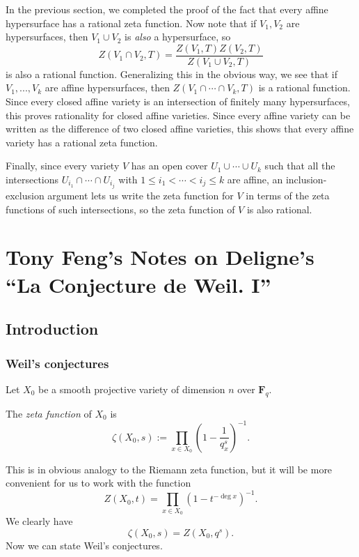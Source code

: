 \documentclass[letterpaper,11pt]{article}
\newcommand{\F}{\mathbf{F}}
\begin{document}
In the previous section, we completed the proof of the fact that every affine hypersurface has a rational zeta function. Now note that if $V_1, V_2$ are hypersurfaces, then $V_1 \cup V_2$ is \emph{also} a hypersurface, so
\[
Z(V_1\cap V_2, T) = \frac{Z(V_1,T)Z(V_2,T)}{Z(V_1\cup V_2,T)}
\]
is also a rational function. Generalizing this in the obvious way, we see that if $V_1, ..., V_k$ are affine hypersurfaces, then $Z(V_1 \cap \cdots \cap V_k, T)$ is a rational function. Since every closed affine variety is an intersection of finitely many hypersurfaces, this proves rationality for closed affine varieties. Since every affine variety can be written as the difference of two closed affine varieties, this shows that every affine variety has a rational zeta function.

Finally, since every variety $V$ has an open cover $U_1 \cup \cdots \cup U_k$ such that all the intersections $U_{i_1} \cap \cdots \cap U_{i_j}$ with $1 \le i_1 < \cdots < i_j \le k$ are affine, an inclusion-exclusion argument lets us write the zeta function for $V$ in terms of the zeta functions of such intersections, so the zeta function of $V$ is also rational.





\section{Tony Feng's Notes on Deligne's ``La Conjecture de Weil. I''}

\subsection{Introduction}


\subsubsection{Weil's conjectures}
Let $X_0$ be a smooth projective variety of dimension $n$ over $\F_q$. 

\begin{defn}
The \emph{zeta function} of $X_0$ is
\[
\zeta(X_0,s) := \prod_{x \in X_0} \left(1-\frac{1}{q_x^s}\right)^{-1}.
\]
\end{defn}

This is in obvious analogy to the Riemann zeta function, but it will be more convenient for us to work with the function
\[
Z(X_0, t) = \prod_{x \in X_0} \left( 1 - t^{-\deg x} \right)^{-1}.
\]
We clearly have 
\[
\zeta(X_0,s) =Z(X_0,q^s). 
\]
Now we can state Weil's conjectures. 
\end{document}
